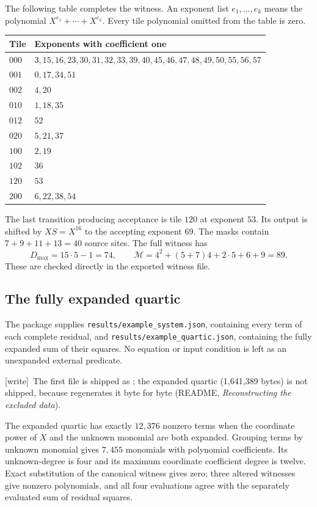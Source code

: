 \documentclass[11pt,letterpaper]{article}
\numberwithin{equation}{section}
\theoremstyle{definition}
\newcommand{\code}[1]{\texttt{\small #1}}
\newcommand{\wtag}{\textup{[write]}}
\begin{document}
The following table completes the witness. An exponent list
$e_1,\ldots,e_k$ means the polynomial $X^{e_1}+\cdots+X^{e_k}$.
Every tile polynomial omitted from the table is zero.
\begin{center}
\small
\begin{tabular}{@{}ll@{}}
\toprule
Tile & Exponents with coefficient one\\
\midrule
$000$ & $3,15,16,23,30,31,32,33,39,40,45,46,47,48,49,50,55,56,57$\\
$001$ & $0,17,34,51$\\
$002$ & $4,20$\\
$010$ & $1,18,35$\\
$012$ & $52$\\
$020$ & $5,21,37$\\
$100$ & $2,19$\\
$102$ & $36$\\
$120$ & $53$\\
$200$ & $6,22,38,54$\\
\bottomrule
\end{tabular}
\end{center}
The last transition producing acceptance is tile $120$ at exponent $53$.
Its output is shifted by $XS=X^{16}$ to the accepting exponent $69$.
The masks contain $7+9+11+13=40$ source sites. The full witness has
\[
 D_{\max}=15\cdot5-1=74,\qquad
 \mathcal M=4^2+(5+7)4+2\cdot5+6+9=89.
\]
These are checked directly in the exported witness file.

\subsection{The fully expanded quartic}

The package supplies \code{results/example\_system.json}, containing every
term of each complete residual, and
\code{results/example\_quartic.json}, containing the fully expanded
sum of their squares. No equation or input condition is left as an
unexpanded external predicate.

\wtag\ The first file is shipped as
; the expanded quartic
(1,641,389 bytes) is not shipped, because
 regenerates it byte for
byte (README, \emph{Reconstructing the excluded data}).

The expanded quartic has exactly $12{,}376$ nonzero terms when the
coordinate power of $X$ and the unknown monomial are both expanded.
Grouping terms by unknown monomial gives $7{,}455$ monomials with
polynomial coefficients. Its unknown-degree is four and its maximum
coordinate coefficient degree is twelve. Exact substitution of the
canonical witness gives zero; three altered witnesses give nonzero
polynomials, and all four evaluations agree with the separately evaluated
sum of residual squares.
\end{document}
